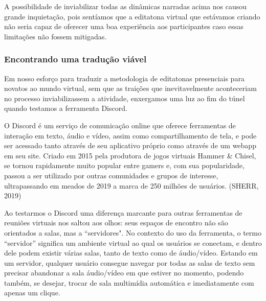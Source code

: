 A possibilidade de inviabilizar todas as dinâmicas narradas acima nos causou grande inquietação, pois sentíamos que a editatona virtual que estávamos criando não seria capaz de oferecer uma boa experiência aos participantes caso essas limitações não fossem mitigadas.

\subsubsection{Encontrando uma tradução viável}

Em nosso esforço para traduzir a metodologia de editatonas presenciais para novatos ao mundo virtual, sem que as traições que inevitavelmente aconteceriam no processo inviabilizassem a atividade, enxergamos uma luz ao fim do túnel quando testamos a ferramenta Discord.

O Discord é um serviço de comunicação online que oferece ferramentas de interação em texto, áudio e vídeo, assim como compartilhamento de tela, e pode ser acessado tanto através de seu aplicativo próprio como através de um webapp em seu site. Criado em 2015 pela produtora de jogos virtuais Hammer \& Chisel, se tornou rapidamente muito popular entre gamers e, com sua popularidade, passou a ser utilizado por outras comunidades e grupos de interesse, ultrapassando em meados de 2019 a marca de 250 milhões de usuários. (SHERR, 2019)

Ao testarmos o Discord uma diferença marcante para outras ferramentas de reuniões virtuais nos saltou aos olhos: seus espaços de encontro não são orientados a salas, mas a “servidores". No contexto do uso da ferramenta, o termo “servidor” significa um ambiente virtual ao qual os usuários se conectam, e dentro dele podem existir várias salas, tanto de texto como de áudio/vídeo. Estando em um servidor, qualquer usuário consegue navegar por todas as salas de texto sem precisar abandonar a sala áudio/vídeo em que estiver no momento, podendo também, se desejar, trocar de sala multimídia automática e imediatamente com apenas um clique.

